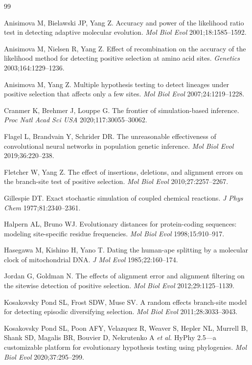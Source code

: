 \documentclass[11pt]{article}
\begin{document}
\begin{thebibliography}{99}

Anisimova M, Bielawski JP, Yang Z.
Accuracy and power of the likelihood ratio test in detecting adaptive molecular evolution.
\emph{Mol Biol Evol} 2001;18:1585--1592.

Anisimova M, Nielsen R, Yang Z.
Effect of recombination on the accuracy of the likelihood method for detecting positive selection at amino acid sites.
\emph{Genetics} 2003;164:1229--1236.

Anisimova M, Yang Z.
Multiple hypothesis testing to detect lineages under positive selection that affects only a few sites.
\emph{Mol Biol Evol} 2007;24:1219--1228.

Cranmer K, Brehmer J, Louppe G.
The frontier of simulation-based inference.
\emph{Proc Natl Acad Sci USA} 2020;117:30055--30062.

Flagel L, Brandvain Y, Schrider DR.
The unreasonable effectiveness of convolutional neural networks in population genetic inference.
\emph{Mol Biol Evol} 2019;36:220--238.

Fletcher W, Yang Z.
The effect of insertions, deletions, and alignment errors on the branch-site test of positive selection.
\emph{Mol Biol Evol} 2010;27:2257--2267.

Gillespie DT.
Exact stochastic simulation of coupled chemical reactions.
\emph{J Phys Chem} 1977;81:2340--2361.

Halpern AL, Bruno WJ.
Evolutionary distances for protein-coding sequences: modeling site-specific residue frequencies.
\emph{Mol Biol Evol} 1998;15:910--917.

Hasegawa M, Kishino H, Yano T.
Dating the human-ape splitting by a molecular clock of mitochondrial DNA.
\emph{J Mol Evol} 1985;22:160--174.

Jordan G, Goldman N.
The effects of alignment error and alignment filtering on the sitewise detection of positive selection.
\emph{Mol Biol Evol} 2012;29:1125--1139.

Kosakovsky Pond SL, Frost SDW, Muse SV.
A random effects branch-site model for detecting episodic diversifying selection.
\emph{Mol Biol Evol} 2011;28:3033--3043.

Kosakovsky Pond SL, Poon AFY, Velazquez R, Weaver S, Hepler NL, Murrell B, Shank SD, Magalis BR, Bouvier D, Nekrutenko A \emph{et al.}
HyPhy 2.5---a customizable platform for evolutionary hypothesis testing using phylogenies.
\emph{Mol Biol Evol} 2020;37:295--299.


\end{thebibliography}
\end{document}
